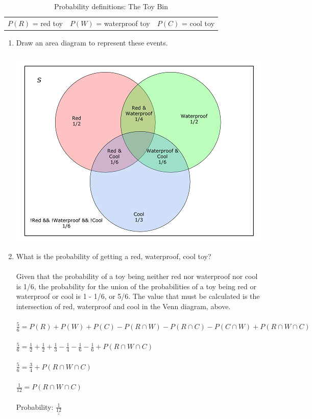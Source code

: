 \documentclass[12pt,a4paper]{article}
\numberwithin{equation}{subsection}
\def\doubleunderline#1{\underline{\underline{#1}}}
\begin{document}
\begin{enumerate}
\begin{table}[h]
\centering
\begin{tabular}{lll}
    $P(R)$ = red toy & $P(W)$ = waterproof toy & $P(C)$ = cool toy \\
\end{tabular}
\caption{Probability definitions: The Toy Bin}
\end{table}
 \begin{enumerate}
\item Draw an area diagram to represent these events. \\ \\
\includegraphics{images/unit3-q2_toybin-venn.png} \\ 

\item What is the probability of getting a red, waterproof, cool toy? \\ \\
Given that the probability of a toy being neither red nor waterproof nor cool is 1/6, the probability for the union of the probabilities of a toy being red or waterproof or cool is 1 - 1/6, or 5/6.  The value that must be calculated is the intersection of red, waterproof and cool in the Venn diagram, above. \\ \\
$\frac{5}{6} = P(R) + P(W) + P(C) - P(R \cap W) - P(R \cap C) - P(C \cap W) + P(R \cap W \cap C)$ \\ \\
$\frac{5}{6} = \frac{1}{2} + \frac{1}{2} + \frac{1}{3} - \frac{1}{4} - \frac{1}{6} - \frac{1}{6} + P(R \cap W \cap C)$ \\ \\
$\frac{5}{6} = \frac{3}{4} + P(R \cap W \cap C)$ \\ \\
$\frac{1}{12} = P(R \cap W \cap C)$ \\ \\
Probability: $\doubleunderline{\frac{1}{12}}$ \\


\end{enumerate}
\end{enumerate}
\end{document}
